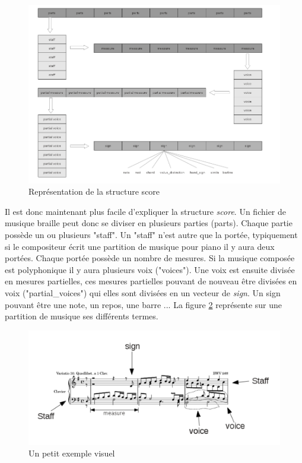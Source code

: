 \begin{figure}[h]
  \centering
  \includegraphics[width=1\textwidth]{images/bmc-score.png}
  \caption{Représentation de la structure score}
  \label{score}
\end{figure}

Il est donc maintenant plus facile d'expliquer la structure
\textit{score}. Un fichier de musique braille peut donc se diviser en
plusieurs parties (parts). Chaque partie possède un ou plusieurs
"staff". Un "staff" n'est autre que la portée, typiquement si le
compositeur écrit une partition de musique pour piano il y aura deux
portées. Chaque portée possède un nombre de mesures. Si la musique
composée est polyphonique il y aura plusieurs voix ("voices"). Une
voix est ensuite divisée en mesures partielles, ces mesures partielles
pouvant de nouveau être divisées en voix ("partial\_voices") qui elles
sont divisées en un vecteur de \textit{sign}. Un sign pouvant être une
note, un repos, une barre ... La figure \ref{musicexe} représente sur
une partition de musique ses différents termes.


\begin{figure}[!h]
  \includegraphics[width=1\textwidth]{images/score-visu.png}
  \caption{Un petit exemple visuel}
  \label{musicexe}
\end{figure}

